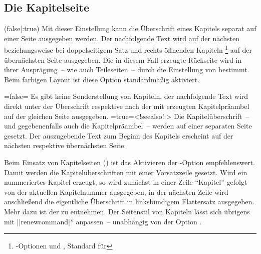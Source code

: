 \begin{DeclareEntity*}{}
\begin{DeclareEntity*}{}
\begin{DeclareEntity*}{}
\subsection{%
  Die Kapitelseite%
  \label{sec:chapter}%
}
%
\begin{Declaration}
  {}
  (false|:true)
Mit dieser Einstellung kann die Überschrift eines Kapitels separat auf einer 
Seite ausgegeben werden. Der nachfolgende Text wird auf der nächsten 
beziehungsweise bei doppelseitigem Satz und rechts öffnenden Kapiteln%
\footnote{%
  \KOMAScript-Optionen  und , 
  Standard für %
}
auf der übernächsten Seite ausgegeben. Die in diesem Fall erzeugte Rückseite 
wird in ihrer Ausprägung~-- wie auch Teileseiten~-- durch die Einstellung von 
 bestimmt. Beim farbigen Layout ist diese Option 
standardmäßig aktiviert. \notudscrartcl
%
\begin{DeclareValues}
\itemval=false=
  Es gibt keine Sonderstellung von Kapiteln, der nachfolgende Text wird direkt 
  unter der Überschrift respektive nach der mit  
  erzeugten Kapitelpräambel auf der gleichen Seite ausgegeben.
\itemval*=true=<!seealso!:>
  Die Kapitelüberschrift~-- und gegebenenfalls auch die Kapitelpräambel~-- 
  werden auf einer separaten Seite gesetzt. Der auszugebende Text zum Beginn 
  des Kapitels erscheint auf der nächsten respektive übernächsten Seite.
\end{DeclareValues}
%
Beim Einsatz von Kapitelseiten () ist das Aktivieren 
der \KOMAScript-Option  
empfehlenswert. Damit werden die Kapitelüberschriften mit einer Vorsatzzeile 
gesetzt. Wird ein nummeriertes Kapitel erzeugt, so wird zunächst in einer Zeile 
\enquote{Kapitel} gefolgt von der aktuellen Kapitelnummer ausgegeben, in der 
nächsten Zeile wird anschließend die eigentliche Überschrift in linksbündigem 
Flattersatz ausgegeben. Mehr dazu ist der  
zu entnehmen. Der Seitenstil von Kapiteln lässt sich übrigens mit 
\Macro||{renewcommand|*}
anpassen~-- unabhängig von der Option .
\end{Declaration}


\end{DeclareEntity*}
\end{DeclareEntity*}
\end{DeclareEntity*}
